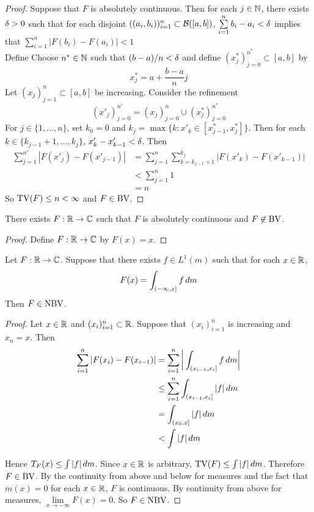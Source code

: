 \documentclass{book}
\begin{document}
	\begin{proof}
	Suppose that $F$ is absolutely continuous. Then for each $j \in \mathbb{N}$, there exists $\delta >0$ such that for each disjoint $((a_i, b_i))_{i=1}^n \subset \mathcal{B}([a,b])$, $\sum\limits_{i=1}^n b_i-a_i < \delta$ implies that $\sum\limits_{i=1}^n|F(b_i)-F(a_i)| < 1$ \\
	Define Choose $n^* \in \mathbb{N}$ such that $(b-a)/n < \delta$ and define $(x^*_j)_{j=0}^{n^*} \subset [a,b]$ by 
	$$x^*_j = a + \frac{b-a}{n}j$$ 
	Let $(x_j)_{j=1}^n \subset [a,b]$ be increasing. Consider the refinement 
	$$(x'_j)_{j=0}^{n'} = (x_j)_{j=0}^n \cup (x^*_j)_{j=0}^{n^*}$$ 
	For $j \in \{1, \ldots, n\}$, set $k_0 = 0$ and $k_j = \max \{k: x'_k \in [x^*_{j-1}, x^*_j] \}$. Then for each $k \in \{k_{j-1} + 1, \ldots, k_j\}$, $x'_k - x_{k-1}' < \delta$. Then 
	\begin{align*}
	\sum_{j=1}^{n'} |F(x'_j) - F(x'_{j-1})| 
	&= \sum_{j=1}^n \sum_{k=k_{j-1}+1}^{k_j} |F(x'_k) - F(x'_{k-1})|  \\
	&< \sum_{j=1}^n 1  \\
	&= n
	\end{align*}
	So $\text{TV}(F) \leq n < \infty$ and $F \in \text{BV}$. 
	\end{proof}
	
	\begin{ex}
	There exists $F:\mathbb{R} \rightarrow \mathbb{C}$ such that $F$ is absolutely continuous and $F \not \in \text{BV}$. 
	\end{ex}	
	
	\begin{proof}
	Define $F: \mathbb{R} \rightarrow \mathbb{C}$ by $F(x) = x$. 
	\end{proof}
	
	\begin{ex}  
		Let $F: \mathbb{R} \rightarrow \mathbb{C}$. Suppose that there exists $f \in L^1(m)$ such that for each $x \in \mathbb{R}$,
		$$F(x) = \int_{(-\infty, x]}f\, d m$$ 
		Then $F \in \text{NBV}$.
	\end{ex}
	
	\begin{proof}
		Let $x \in \mathbb{R}$ and $(x_i)_{i=1}^n \subset \mathbb{R}$. Suppose that $(x_i)_{i=1}^n$ is increasing and $x_n=x$. Then 
		\begin{align*}
			\sum_{i=1}^n|F(x_i)-F(x_{i-1})| 
			&= \sum_{i=1}^n \bigg| \int_{(x_{i-1},x_i]}f\, d m \bigg|\\
			& \leq \sum_{i=1}^n \int_{(x_{i-1},x_i]}|f|\, d m \\
			& = \int_{(x_0,x]}|f|\, d m\\
			& < \int|f|\, d m
		\end{align*}
		
		Hence $T_F(x) \leq \int |f|\, d m$. Since $x \in \mathbb{R}$ is arbitrary, $\text{TV}(F) \leq \int |f|\, d m$. Therefore $F \in \text{BV}$. By the continuity from above and below for measures and the fact that $m({x})=0$ for each $x \in \mathbb{R}$, $F$ is continuous. By continuity from above for measures, $\lim\limits_{x \rightarrow -\infty} F(x) =0$. So $F \in \text{NBV}$.
	\end{proof}
	
\end{document}
